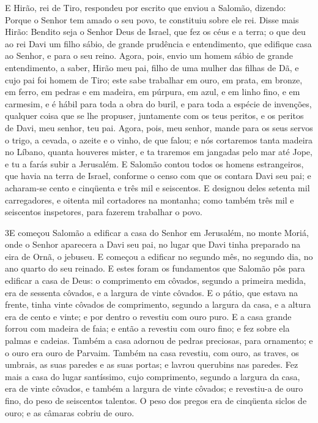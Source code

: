 E Hirão, rei de Tiro, respondeu por escrito que enviou a Salomão,
dizendo: Porque o Senhor tem amado o seu povo, te constituiu sobre
ele rei. Disse mais Hirão: Bendito seja o Senhor Deus de
Israel, que fez os céus e a terra; o que deu ao rei Davi um filho
sábio, de grande prudência e entendimento, que edifique casa ao
Senhor, e para o seu reino. Agora, pois, envio um homem sábio
de grande entendimento, a saber, Hirão meu pai, filho de uma
mulher das filhas de Dã, e cujo pai foi homem de Tiro; este sabe
trabalhar em ouro, em prata, em bronze, em ferro, em pedras e em
madeira, em púrpura, em azul, e em linho fino, e em carmesim, e é
hábil para toda a obra do buril, e para toda a espécie de invenções,
qualquer coisa que se lhe propuser, juntamente com os teus peritos,
e os peritos de Davi, meu senhor, teu pai. Agora, pois, meu
senhor, mande para os seus servos o trigo, a cevada, o azeite e o
vinho, de que falou; e nós cortaremos tanta madeira no
Líbano, quanta houveres mister, e ta traremos em jangadas pelo mar
até Jope, e tu a farás subir a Jerusalém. E Salomão contou
todos os homens estrangeiros, que havia na terra de Israel, conforme
o censo com que os contara Davi seu pai; e acharam-se cento e
cinqüenta e três mil e seiscentos. E designou deles setenta
mil carregadores, e oitenta mil cortadores na montanha; como também
três mil e seiscentos inspetores, para fazerem trabalhar o povo.

\medskip

\lettrine{3} E começou Salomão a edificar a casa do Senhor em
Jerusalém, no monte Moriá, onde o Senhor aparecera a Davi seu pai,
no lugar que Davi tinha preparado na eira de Ornã, o jebuseu. E
começou a edificar no segundo mês, no segundo dia, no ano quarto do
seu reinado. E estes foram os fundamentos que Salomão pôs para
edificar a casa de Deus: o comprimento em côvados, segundo a
primeira medida, era de sessenta côvados, e a largura de vinte
côvados. E o pátio, que estava na frente, tinha vinte côvados de
comprimento, segundo a largura da casa, e a altura era de cento e
vinte; e por dentro o revestiu com ouro puro. E a casa grande
forrou com madeira de faia; e então a revestiu com ouro fino; e fez
sobre ela palmas e cadeias. Também a casa adornou de pedras
preciosas, para ornamento; e o ouro era ouro de Parvaim. Também
na casa revestiu, com ouro, as traves, os umbrais, as suas paredes e
as suas portas; e lavrou querubins nas paredes. Fez mais a casa
do lugar santíssimo, cujo comprimento, segundo a largura da casa,
era de vinte côvados, e também a largura de vinte côvados; e
revestiu-a de ouro fino, do peso de seiscentos talentos. O peso
dos pregos era de cinqüenta siclos de ouro; e as câmaras cobriu de
ouro.

